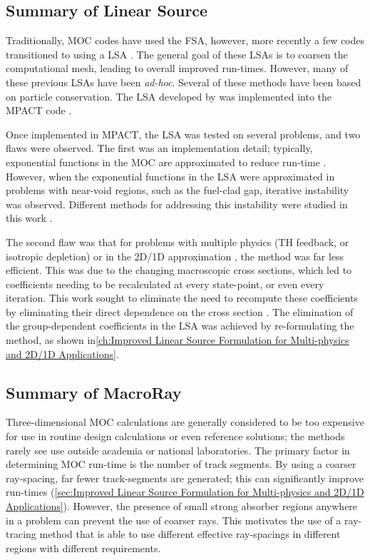 {{    \subsection{Summary of Linear Source}{\label{ssec:Summary:Linear Source}
      Traditionally, \ac{MOC} codes have used the \acf{FSA}, however, more recently a few codes transitioned to using a \acf{LSA} \cite{Halsall1993,Petkov1999,Santandrea2002,Tang2009,Rabiti2009,Hebert2016,Ferrer2016,Gunow2018}.
      The general goal of these \acp{LSA} is to coarsen the computational mesh, leading to overall improved run-times.
      However, many of these previous \acp{LSA} have been \emph{ad-hoc}.
      Several of these methods \cite{Santandrea2002,Hebert2016,Ferrer2016} have been based on particle conservation.
      The \ac{LSA} developed by \citet{Ferrer2016} was implemented into the MPACT code \cite{Fitzgerald2018,Fitzgerald2019}.

      Once implemented in MPACT, the \ac{LSA} was tested on several problems, and two flaws were observed.
      The first was an implementation detail; typically, exponential functions in the \ac{MOC} are approximated to reduce run-time \cite{Yamamoto2004}.
      However, when the exponential functions in the \ac{LSA} were approximated in problems with near-void regions, such as the fuel-clad gap, iterative instability was observed.
      Different methods for addressing this instability were studied in this work \cite{Fitzgerald2018}.

      The second flaw was that for problems with multiple physics (\acf{TH} feedback, or isotropic depletion) or in the 2D/1D approximation \cite{Collins2016}, the method was far less efficient.
      This was due to the changing macroscopic cross sections, which led to coefficients needing to be recalculated at every state-point, or even every iteration.
      This work sought to eliminate the need to recompute these coefficients by eliminating their direct dependence on the cross section \cite{Fitzgerald2019}.
      The elimination of the group-dependent coefficients in the \ac{LSA} was achieved by re-formulating the method, as shown in\cref{ch:Improved Linear Source Formulation for Multi-physics and 2D/1D Applications}.
    }

    \subsection{Summary of MacroRay}{\label{ssec:Summary:MacroRay}
      Three-dimensional \ac{MOC} calculations are generally considered to be too expensive for use in routine design calculations or even reference solutions; the methods rarely see use outside academia or national laboratories.
      The primary factor in determining \ac{MOC} run-time is the number of track segments.
      By using a coarser ray-spacing, far fewer track-segments are generated; this can significantly improve run-times (\cref{sec:Improved Linear Source Formulation for Multi-physics and 2D/1D Applications}).
      However, the presence of small strong absorber regions anywhere in a problem can prevent the use of coarser rays.
      This motivates the use of a ray-tracing method that is able to use different effective ray-spacings in different regions with different requirements.

}}}
